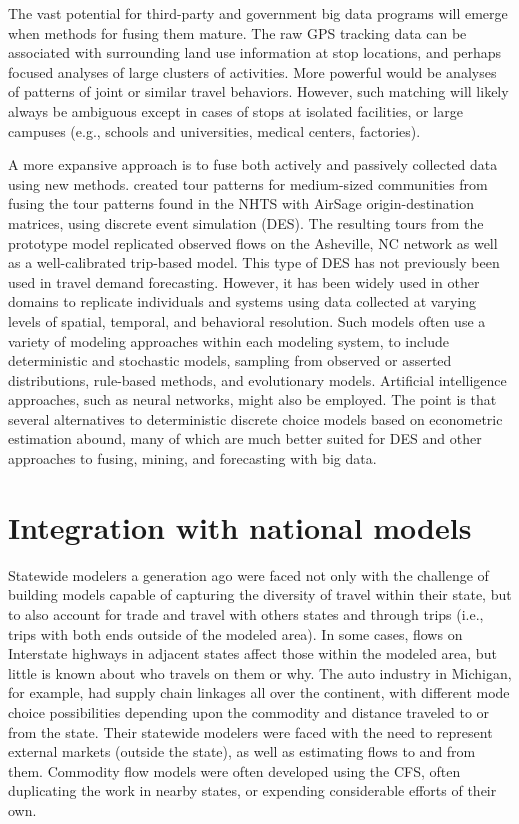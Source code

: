 The vast potential for third-party and government big data programs will emerge when methods for fusing them mature. The raw GPS tracking data can be associated with surrounding land use information at stop locations, and perhaps focused analyses of large clusters of activities. More powerful would be analyses of patterns of joint or similar travel behaviors. However, such matching will likely always be ambiguous except in cases of stops at isolated facilities, or large campuses (e.g., schools and universities, medical centers, factories).

A more expansive approach is to fuse both actively and passively collected data using new methods. \cite{kressner16} created tour patterns for medium-sized communities from fusing the tour patterns found in the NHTS with AirSage origin-destination matrices, using discrete event simulation (DES). The resulting tours from the prototype model replicated observed flows on the Asheville, NC network as well as a well-calibrated trip-based model. This type of DES has not previously been used in travel demand forecasting. However, it has been widely used in other domains to replicate individuals and systems using data collected at varying levels of spatial, temporal, and behavioral resolution. Such models often use a variety of modeling approaches within each modeling system, to include deterministic and stochastic models, sampling from observed or asserted distributions, rule-based methods, and evolutionary models. Artificial intelligence approaches, such as neural networks, might also be employed. The point is that several alternatives to deterministic discrete choice models based on econometric estimation abound, many of which are much better suited for DES and other approaches to fusing, mining, and forecasting with big data.

\section{Integration with national models}\label{sec:national-model-integration}

Statewide modelers a generation ago were faced not only with the challenge of building models capable of capturing the diversity of travel within their state, but to also account for trade and travel with others states and through trips (i.e., trips with both ends outside of the modeled area). In some cases, flows on Interstate highways in adjacent states affect those within the modeled area, but little is known about who travels on them or why. The auto industry in Michigan, for example, had supply chain linkages all over the continent, with different mode choice possibilities depending upon the commodity and distance traveled to or from the state. Their statewide modelers were faced with the need to represent external markets (outside the state), as well as estimating flows to and from them. Commodity flow models were often developed using the CFS, often duplicating the work in nearby states, or expending considerable efforts of their own.

